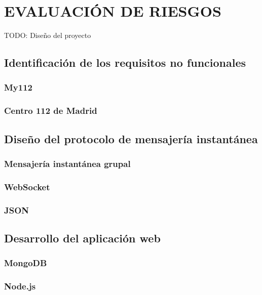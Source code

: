 \chapter{EVALUACIÓN DE RIESGOS\label{sec:disenho}}

TODO: Diseño del proyecto

\section{Identificación de los requisitos no funcionales}

\subsection{My112}

\subsection{Centro 112 de Madrid}

\section{Diseño del protocolo de mensajería instantánea}

\subsection{Mensajería instantánea grupal}

\subsection{WebSocket}

\subsection{JSON}

\section{Desarrollo del aplicación web}

\subsection{MongoDB}

\subsection{Node.js}

